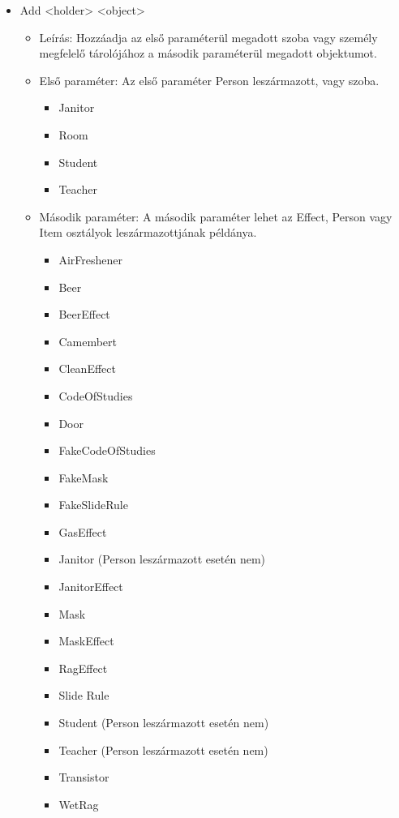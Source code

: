 \begin{itemize}
    \item Add <holder> <object>
    \begin{itemize}
        \item Leírás: Hozzáadja az első paraméterül megadott szoba vagy személy megfelelő tárolójához a második paraméterül megadott objektumot.
        
        \item Első paraméter: Az első paraméter Person leszármazott, vagy szoba.
        \begin{itemize}
            \item Janitor
            \item Room
            \item Student
            \item Teacher
        \end{itemize}
        \item Második paraméter: A második paraméter lehet az Effect, Person vagy Item osztályok leszármazottjának példánya.
        \begin{itemize}
            \item AirFreshener
            \item Beer
            \item BeerEffect
            \item Camembert
            \item CleanEffect
            \item CodeOfStudies
            \item Door
            \item FakeCodeOfStudies
            \item FakeMask
            \item FakeSlideRule
            \item GasEffect
            \item Janitor (Person leszármazott esetén nem)
            \item JanitorEffect
            \item Mask
            \item MaskEffect
            \item RagEffect
            \item Slide Rule
            \item Student (Person leszármazott esetén nem)
            \item Teacher (Person leszármazott esetén nem) 
            \item Transistor
            \item WetRag
        \end{itemize}
    \end{itemize}
    

\end{itemize}
